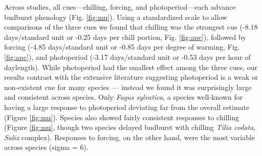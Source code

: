 \documentclass{article}
\begin{document}
\par Across studies, all cues---chilling, forcing, and photoperiod---each advance budburst phenology (Fig. \ref {fig:mu}). Using a standardized scale to allow comparisons of the three cues we found that chilling was the strongest cue (-8.18 days/standard unit or -0.25 days per chill portion, Fig. \ref {fig:apc}), followed by forcing (-4.85 days/standard unit or -0.85 days per degree of warming, Fig. \ref {fig:apc}), and photoperiod (-3.17 days/standard unit or -0.53 days per hour of daylength). While photoperiod had the smallest effect among the three cues, our results contrast with the extensive literature suggesting photoperiod is a weak or non-existent cue for many species \citep{zohner2016,koerner2010a}--- instead we found it was surprisingly large and consistent across species. Only \emph{Fagus sylvatica}, a species well-known for having a large response to photoperiod deviating far from the overall estimate (Figure \ref {fig:mu}). Species also showed fairly consistent responses to chilling (Figure \ref {fig:mu}, though two species delayed budburst with chilling \emph{Tilia codata}, \emph{Salix} complex). Responses to forcing, on the other hand, were the most variable across species (sigma = 6).

\end{document}
